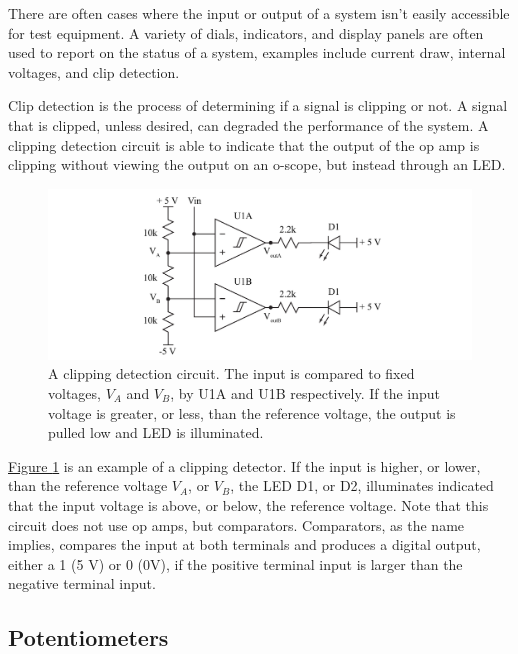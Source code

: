 There are often cases where the input or output of a system isn't easily accessible for test equipment. A variety of dials, indicators, and display panels are often used to report on the status of a system, examples include current draw, internal voltages, and clip detection. 

Clip detection is the process of determining if a signal is clipping or not. A signal that is clipped, unless desired, can degraded the performance of the system. A clipping detection circuit is able to indicate that the output of the op amp is clipping without viewing the output on an o-scope, but instead through an LED. 

\begin{figure} [h]
	\centering
		\includegraphics[width=1\textwidth]{Lab6compLED.pdf}
	\caption{A clipping detection circuit. The input is compared to fixed voltages, $V_A$ and $V_B$, by U1A and U1B respectively. If the input voltage is greater, or less, than the reference voltage, the output is pulled low and LED is illuminated.} \label{fig:clipdetect}
\end{figure}

\hyperref[fig:clipdetect]{Figure \ref*{fig:clipdetect}} is an example of a clipping detector. If the input is higher, or lower, than the reference voltage $V_A$, or $V_B$, the LED D1, or D2, illuminates indicated that the input voltage is above, or below, the reference voltage. Note that this circuit does not use op amps, but comparators. Comparators, as the name implies, compares the input at both terminals and produces a digital output, either a 1 (5 V) or 0 (0V), if the positive terminal input is larger than the negative terminal input. 


\subsection{Potentiometers}

